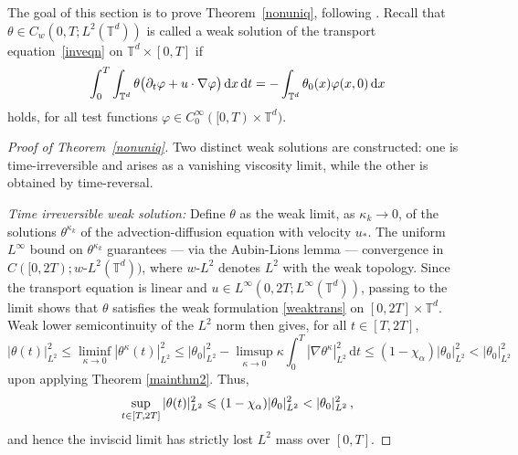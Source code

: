 \documentclass[12pt]{report}   %
\renewcommand{\leq}{\leqslant}
\numberwithin{equation}{section}
\theoremstyle{plain}
\theoremstyle{definition}
\theoremstyle{remark}
\DeclarePairedDelimiter{\abs}{\lvert}{\rvert}
\DeclarePairedDelimiter{\paren}{(}{)}
\newcommand{\rmd}{\, \mathrm{d}}
\begin{document}
The goal of this section is to prove Theorem~\ref{nonuniq}, following \cite{DrivasElgindiEA22}.
Recall that $\theta\in C_w(0,T; L^2(\mathbb{T}^d))$ is called a weak solution of the transport equation~\eqref{inveqn} on $\mathbb{T}^d\times [0,T]$ if
\begin{equation}\label{weaktrans}
  \int_0^T \int_{\mathbb{T}^d}
    \theta \paren[\big]{
      \partial_t \varphi  + u  \cdot \nabla \varphi
    }
    \rmd x \rmd t
    =  -\int_{\mathbb{T}^d} \theta_0(x) \varphi(x,0)  \rmd x
\end{equation}
holds, for all test functions $\varphi \in C_0^\infty ([0,T) \times \mathbb{T}^d)$.

  \begin{proof}[Proof of Theorem~\ref{nonuniq}]
  Two distinct weak solutions are constructed: one is time-irreversible and arises as a vanishing viscosity limit, while the other is obtained by time-reversal.
  \medskip

  \emph{Time irreversible weak solution:}
Define $\theta$ as the weak limit, as $\kappa_k \to 0$, of the solutions $\theta^{\kappa_k}$ of the advection-diffusion equation with velocity $u_*$. The uniform $L^\infty$ bound on $\theta^{\kappa_k}$ guarantees — via the Aubin-Lions lemma — convergence in $C([0,2T); w\text{-}L^2(\mathbb{T}^d))$, where $w\text{-}L^2$ denotes $L^2$ with the weak topology.
Since the transport equation is linear and $u\in L^\infty(0,2T; L^\infty(\mathbb{T}^d))$, passing to the limit shows that $\theta$ satisfies the weak formulation \eqref{weaktrans} on $[0,2T]\times \mathbb{T}^d$.
Weak lower semicontinuity of the $L^2$ norm then gives, for all $t\in [T,2T]$, 
  \begin{equation}
  | \theta(t)|_{L^2}^2 \leq \liminf_{\kappa \to 0}  | \theta^\kappa(t)|_{L^2}^2
    \leq   | \theta_0|_{L^2}^2 - \limsup_{\kappa \to 0} \kappa \int_0^T |\nabla \theta^\kappa|_{L^2}^2 \rmd t\leq  (1- \chi_\alpha )| \theta_0|_{L^2}^2 <| \theta_0|_{L^2}^2 
  \end{equation}
upon applying Theorem \ref{mainthm2}.
Thus,
\begin{equation}
\label{dissipating}
  \sup_{t\in [T, 2T]} | \theta(t)|_{L^2}^2 \leq (1 - \chi_\alpha) \abs{\theta_0}_{L^2}^2 <    | \theta_0 |_{L^2}^2 \,,
\end{equation}
and hence the inviscid limit has strictly lost $L^2$ mass over $[0,T]$.
\medskip


\end{proof}
\end{document}
